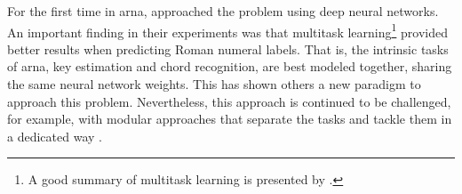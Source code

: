 

For the first time in \gls{arna},
\textcite{chen2018functional} approached the problem using
deep neural networks. An important finding in their
experiments was that multitask learning\footnote{A good
summary of multitask learning is presented by
\textcite{ruder2017overview}.} provided better results when
predicting Roman numeral labels. That is, the intrinsic
tasks of \gls{arna}, key estimation and chord recognition,
are best modeled together, sharing the same neural network
weights. This has shown others a new paradigm to approach
this problem. Nevertheless, this approach is continued to be
challenged, for example, with modular approaches that
separate the tasks and tackle them in a dedicated way
\parencite{mcleod2021modular}.
